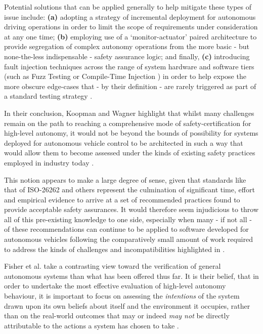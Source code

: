 \documentclass[conference]{IEEEtran}
\begin{document}
Potential solutions that can be applied generally to help mitigate these types of issue include: \textbf{(a)} adopting a strategy of incremental deployment for autonomous driving operations in order to limit the scope of requirements under consideration at any one time; \textbf{(b)} employing use of a `monitor-actuator' paired architecture to provide segregation of complex autonomy operations from the more basic - but none-the-less indispensable - safety assurance logic; and finally, \textbf{(c)} introducing fault injection techniques across the range of system hardware and software tiers (such as Fuzz Testing \cite{fuzz-testing} or Compile-Time Injection \cite{compile-time-injection}) in order to help expose the more obscure edge-cases that - by their definition - are rarely triggered as part of a standard testing strategy \cite{wagner-2}. 

In their conclusion, Koopman and Wagner highlight that whilst many challenges remain on the path to reaching a comprehensive mode of safety-certification for high-level autonomy, it would not be beyond the bounds of possibility for systems deployed for autonomous vehicle control to be architected in such a way that would allow them to become assessed under the kinds of existing safety practices employed in industry today \cite{wagner-2}. 

This notion appears to make a large degree of sense, given that standards like that of ISO-26262 and others represent the culmination of significant time, effort and empirical evidence to arrive at a set of recommended practices found to provide acceptable safety assurances. It would therefore seem injudicious to throw all of this pre-existing knowledge  to one side, especially when many - if not all - of these recommendations can continue to be applied to software developed for autonomous vehicles following the comparatively small amount of work required to address the kinds of challenges and incompatibilities highlighted in \cite{wagner-2}. 


Fisher et al. take a contrasting view toward the verification of general autonomous systems than what has been offered thus far. It is their belief, that in order to undertake the most effective evaluation of high-level autonomy behaviour, it is important to focus on assessing the \textit{intentions} of the system drawn upon its own beliefs about itself and the environment it occupies, rather than on the real-world outcomes that may or indeed \textit{may not} be directly attributable to the actions a system has chosen to take \cite{fisher-1}. 
\end{document}
